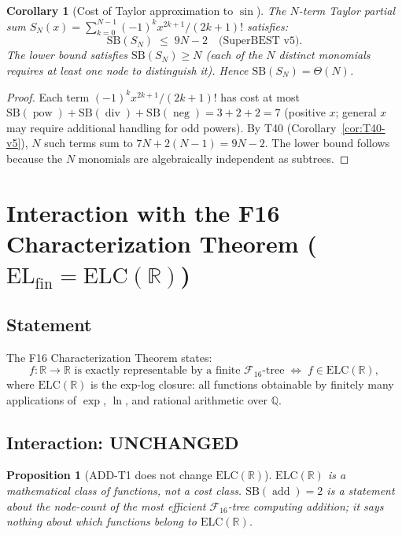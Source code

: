 \documentclass[12pt,a4paper]{article}
\newtheorem{corollary}[theorem]{Corollary}
\newtheorem{proposition}[theorem]{Proposition}
\theoremstyle{definition}
\newcommand{\divop}{\operatorname{div}}
\newcommand{\addop}{\operatorname{add}}
\newcommand{\negop}{\operatorname{neg}}
\newcommand{\powop}{\operatorname{pow}}
\newcommand{\SB}{\mathrm{SB}}
\newcommand{\F}{\mathcal{F}_{16}}
\newcommand{\ELC}{\mathrm{ELC}(\mathbb{R})}
\newcommand{\ELfin}{\mathrm{EL}_{\mathrm{fin}}}
\newcommand{\R}{\mathbb{R}}
\newcommand{\Q}{\mathbb{Q}}
\newcommand{\Unchanged}{\textcolor{unchanged}{\textbf{UNCHANGED}}}
\begin{document}
\begin{corollary}[Cost of Taylor approximation to $\sin$]
\label{cor:sin-approx}
The $N$-term Taylor partial sum $S_N(x) = \sum_{k=0}^{N-1} (-1)^k x^{2k+1}/(2k+1)!$
satisfies:
\[
  \SB(S_N) \;\leq\; 9N - 2 \quad \text{(SuperBEST v5)}.
\]
The lower bound satisfies $\SB(S_N) \geq N$ (each of the $N$ distinct monomials
requires at least one node to distinguish it).  Hence $\SB(S_N) = \Theta(N)$.
\end{corollary}

\begin{proof}
Each term $(-1)^k x^{2k+1}/(2k+1)!$ has cost at most
$\SB(\powop)+\SB(\divop)+\SB(\negop) = 3+2+2 = 7$
(positive $x$; general $x$ may require additional handling for odd powers).
By T40 (Corollary~\ref{cor:T40-v5}), $N$ such terms sum to $7N+2(N-1)=9N-2$.
The lower bound follows because the $N$ monomials are algebraically independent
as subtrees.
\end{proof}

\section{Interaction with the F16 Characterization Theorem ($\ELfin = \ELC$)}
\label{sec:ELC}

\subsection{Statement}

The F16 Characterization Theorem states:
\[
  f:\R\to\R\text{ is exactly representable by a finite }\F\text{-tree}
  \;\iff\; f\in\ELC,
\]
where $\ELC$ is the exp-log closure: all functions obtainable by finitely many
applications of $\exp$, $\ln$, and rational arithmetic over $\Q$.

\subsection{Interaction: \Unchanged}

\begin{proposition}[ADD-T1 does not change $\ELC$]
$\ELC$ is a mathematical class of functions, not a cost class.
$\SB(\addop)=2$ is a statement about the node-count of the most efficient
$\F$-tree computing addition; it says nothing about which functions belong to $\ELC$.
\end{proposition}
\end{document}
